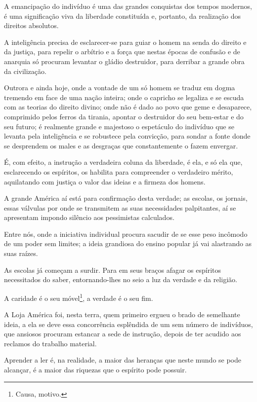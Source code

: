 \asterisc{}

A emancipação do indivíduo é uma das grandes conquistas dos tempos
modernos, é uma significação viva da liberdade constituída e, portanto,
da realização dos direitos absolutos.

A inteligência precisa de esclarecer-se para guiar o homem na senda do
direito e da justiça, para repelir o arbítrio e a força que nestas
épocas de confusão e de anarquia só procuram levantar o gládio
destruidor, para derribar a grande obra da civilização.

Outrora e ainda hoje, onde a vontade de um só homem se traduz em dogma
tremendo em face de uma nação inteira; onde o capricho se legaliza e se
escuda com as teorias do direito divino; onde não é dado ao povo que
geme e desaparece, comprimido pelos ferros da tirania, apontar o
destruidor do seu bem-estar e do seu futuro; é realmente grande e
majestoso o espetáculo do indivíduo que se levanta pela inteligência e
se robustece pela convicção, para sondar a fonte donde se desprendem os
males e as desgraças que constantemente o fazem envergar.

É, com efeito, a instrução a verdadeira coluna da liberdade, é ela, e só
ela que, esclarecendo os espíritos, os habilita para compreender o
verdadeiro mérito, aquilatando com justiça o valor das ideias e a
firmeza dos homens.

A grande América aí está para confirmação desta verdade; as escolas, os
jornais, essas válvulas por onde se transmitem as suas necessidades
palpitantes, aí se apresentam impondo silêncio aos pessimistas
calculados.

Entre nós, onde a iniciativa individual procura sacudir de se esse peso
incômodo de um poder sem limites; a ideia grandiosa do ensino popular já
vai alastrando as suas raízes.

As escolas já começam a surdir. Para em seus braços afagar os espíritos
necessitados do saber, entornando-lhes no seio a luz da verdade e da
religião.

A caridade é o seu móvel\footnote{Causa, motivo.}, a verdade é o seu
fim.

A Loja América foi, nesta terra, quem primeiro ergueu o brado de
semelhante ideia, a ela se deve essa concorrência esplêndida de um sem
número de indivíduos, que ansiosos procuram estancar a sede de
instrução, depois de ter acudido aos reclamos do trabalho material.

Aprender a ler é, na realidade, a maior das heranças que neste mundo se
pode alcançar, é a maior das riquezas que o espírito pode possuir.


